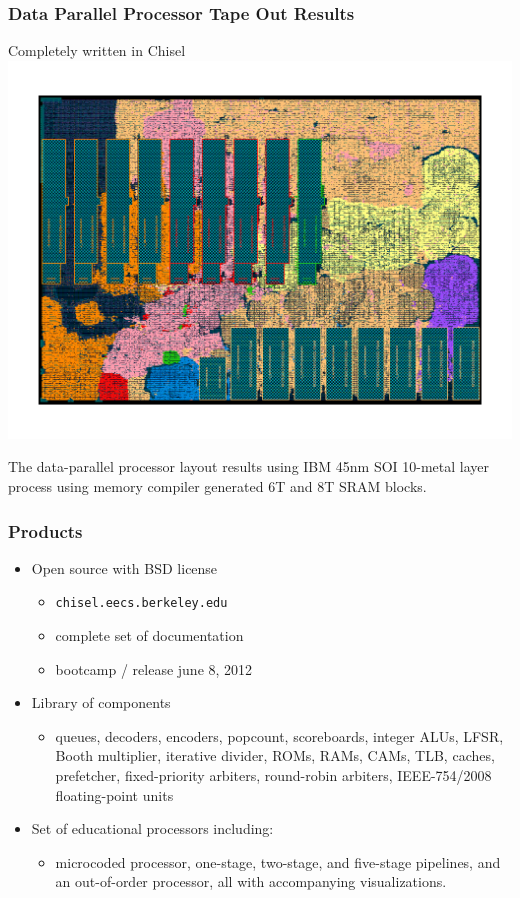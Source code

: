 \documentclass[xcolor=pdflatex,dvipsnames,table]{beamer}
\begin{document}
\begin{frame}[fragile]
\frametitle{Data Parallel Processor Tape Out Results}

\begin{center}
Completely written in Chisel
\includegraphics[height=0.7\textheight]{figs/ibm45.png}

\begin{footnotesize}
The data-parallel processor layout results using IBM 45nm SOI 10-metal layer process using memory compiler generated 6T and 8T SRAM blocks.
\end{footnotesize}
\end{center}

\end{frame}

\begin{frame}[fragile]
\frametitle{Products}

\begin{itemize}
\item Open source with BSD license
\begin{itemize}
\item \verb+chisel.eecs.berkeley.edu+
\item complete set of documentation
\item bootcamp / release june 8, 2012
\end{itemize}
\item Library of components
\begin{itemize}
\item queues, decoders, encoders, popcount, scoreboards, integer ALUs, LFSR, Booth multiplier, iterative divider, ROMs, RAMs, CAMs, TLB, caches, prefetcher, fixed-priority arbiters, round-robin arbiters, IEEE-754/2008 floating-point units
\end{itemize}
\item Set of educational processors including:
\begin{itemize}
\item microcoded processor, one-stage, two-stage, and five-stage pipelines, and an out-of-order processor, all with accompanying visualizations.
\end{itemize}
\end{itemize}

\end{frame}
\end{document}
